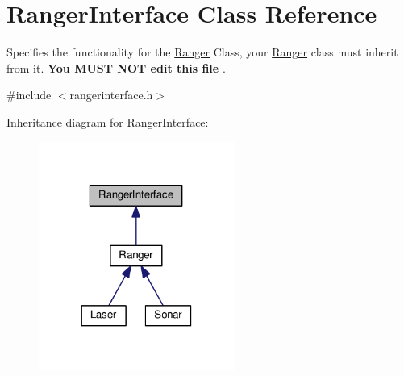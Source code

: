 \hypertarget{class_ranger_interface}{}\section{Ranger\+Interface Class Reference}
\label{class_ranger_interface}


Specifies the functionality for the \hyperlink{class_ranger}{Ranger} Class, your \hyperlink{class_ranger}{Ranger} class must inherit from it. {\bfseries  You M\+U\+ST N\+OT edit this file }.  




{\ttfamily \#include $<$rangerinterface.\+h$>$}



Inheritance diagram for Ranger\+Interface\+:
\nopagebreak
\begin{figure}[H]
\begin{center}
\leavevmode
\includegraphics[width=182pt]{class_ranger_interface__inherit__graph}
\end{center}
\end{figure}
